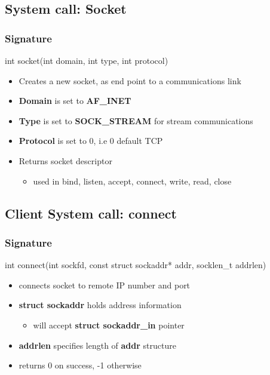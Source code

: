 \documentclass{report}
\begin{document}
    \bigbreak \noindent 
    \subsection{System call: Socket}
    \bigbreak \noindent 
    \subsubsection{Signature}
    \bigbreak \noindent 
    \begin{cppcode}
    int socket(int domain, int type, int protocol)
    \end{cppcode}
    \begin{itemize}
        \item Creates a new socket, as end point to a communications link
        \item \textbf{Domain} is set to \textbf{AF\_INET}
        \item \textbf{Type} is set to \textbf{SOCK\_STREAM} for stream communications
        \item \textbf{Protocol} is set to 0, i.e 0 default TCP
        \item Returns socket descriptor
            \begin{itemize}
                \item used in bind, listen, accept, connect, write, read, close
            \end{itemize}
    \end{itemize}

    \bigbreak \noindent 
    \subsection{Client System call: connect}
    \bigbreak \noindent 
    \subsubsection{Signature}
    \bigbreak \noindent 
    \begin{cppcode}
        int connect(int sockfd, const struct sockaddr* addr, socklen_t addrlen)
    \end{cppcode}
    \bigbreak \noindent 
    \begin{itemize}
        \item connects socket to remote IP number and port
        \item \textbf{struct sockaddr} holds address information
            \begin{itemize}
                \item will accept \textbf{struct sockaddr\_in} pointer
            \end{itemize}
        \item \textbf{addrlen} specifies length of \textbf{addr} structure
        \item returns 0 on success, -1 otherwise
    \end{itemize}
\end{document}
